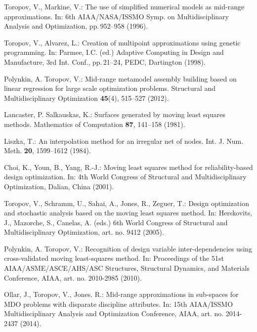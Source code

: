 \documentclass[runningheads,a4paper]{llncs}
\begin{document}
\begin{thebibliography}{10}
Toropov, V., Markine, V.:
\newblock The use of simplified numerical models as mid-range approximations.
\newblock In: 6th AIAA/NASA/ISSMO Symp. on Multidisciplinary Analysis and Optimization, pp.\,952--958 (1996).

Toropov, V., Alvarez, L.:
\newblock Creation of multipoint approximations using genetic programming.
\newblock In: Parmee, I.C. (ed.) Adaptive Computing in Design and Manufacture, 3rd Int. Conf.,
   pp.\,21--24, PEDC, Dartington (1998).

Polynkin, A. Toropov, V.:
\newblock Mid-range metamodel assembly building based on linear regression for large scale optimization problems.
\newblock Structural and Multidisciplinary Optimization \textbf{45}(4), 515--527
(2012).

Lancaster, P. Salkauskas, K.:
\newblock Surfaces generated by moving least squares methods.
\newblock Mathematics of Computation \textbf{87}, 141--158 (1981).

Liszka, T.:
\newblock An interpolation method for an irregular net of nodes.
\newblock Int. J. Num. Meth. \textbf{20}, 1599--1612 (1984).

Choi, K., Youn, B., Yang, R.-J.:
\newblock Moving least squares method for reliability-based design optimization.
\newblock In: 4th World Congress of Structural and Multidisciplinary Optimization, Dalian, China
(2001).

Toropov, V., Schramm, U., Sahai, A., Jones, R., Zeguer, T.:
\newblock Design optimization and stochastic analysis based on the moving least squares method.
\newblock In: Herskovits, J., Mazorche, S., Canelas, A. (eds.) 6th World Congress of Structural and Multidisciplinary Optimization, art. no. 9412
(2005).

Polynkin, A. Toropov, V.:
\newblock Recognition of design variable inter-dependencies using cross-validated moving least-squares method.
\newblock In: Proceedings of the 51st AIAA/ASME/ASCE/AHS/ASC Structures, Structural Dynamics, and Materials Conference, AIAA, art. no. 2010-2985
(2010).

Ollar, J., Toropov, V., Jones. R.:
\newblock  Mid-range approximations in sub-spaces for MDO problems with disparate discipline attributes.
\newblock In: 15th AIAA/ISSMO Multidisciplinary Analysis and Optimization Conference, AIAA, art. no. 2014-2437
(2014).


\end{thebibliography}
\end{document}
